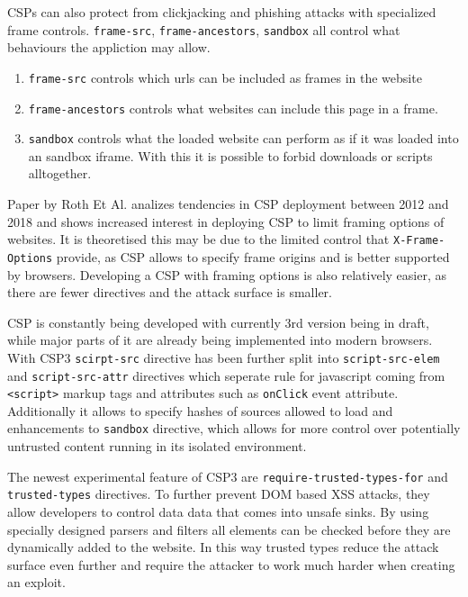 \documentclass[11]{article}   %
\begin{document}
CSPs can also protect from clickjacking and phishing attacks with specialized frame controls. 
\texttt{frame-src}, \texttt{frame-ancestors}, \texttt{sandbox} all control what behaviours the appliction may allow.
\begin{enumerate}
	\item \texttt{frame-src} controls which urls can be included as frames in the website
	\item \texttt{frame-ancestors} controls what websites can include this page in a frame. 
	\item \texttt{sandbox} controls what the loaded website can perform as if it was loaded into an sandbox iframe. With this it is possible to forbid downloads or scripts alltogether.
\end{enumerate}
Paper by Roth Et Al. analizes tendencies in CSP deployment between 2012 and 2018 and shows increased interest in deploying CSP to limit framing options of websites. \cite{osti_10173479}
It is theoretised this may be due to the limited control that \texttt{X-Frame-Options} provide, as CSP allows to specify frame origins and is better supported by browsers.
Developing a CSP with framing options is also relatively easier, as there are fewer directives and the attack surface is smaller.


CSP is constantly being developed with currently 3rd version being in draft, while major parts of it are already being implemented into modern browsers.
With CSP3 \texttt{scirpt-src} directive has been further split into \texttt{script-src-elem} and \texttt{script-src-attr} directives which seperate rule for javascript coming from \texttt{<script>} markup tags and attributes such as \texttt{onClick} event attribute.
Additionally it allows to specify hashes of sources allowed to load and enhancements to \texttt{sandbox} directive, which allows for more control over potentially untrusted content running in its isolated environment.

The newest experimental feature of CSP3 are \texttt{require-trusted-types-for} and \texttt{trusted-types} directives. \cite{TTwebdev} \cite{TTmozdev}
To further prevent DOM based XSS attacks, they allow developers to control data data that comes into unsafe sinks.
By using specially designed parsers and filters all elements can be checked before they are dynamically added to the website.
In this way trusted types reduce the attack surface even further and require the attacker to work much harder when creating an exploit.
\end{document}

